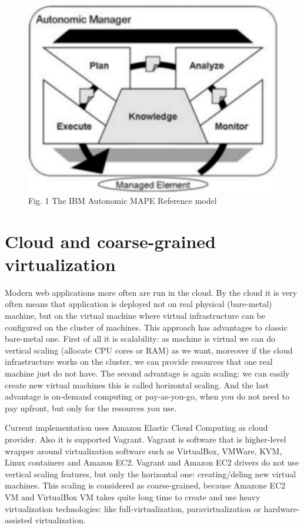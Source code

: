 \begin{figure}[h]
  \centering
    \includegraphics[natwidth=264,natheight=198]{./pictures/mape}
    \caption{Fig. 1 The IBM Autonomic MAPE Reference model}
\end{figure}
  

\section{Cloud and coarse-grained virtualization}
Modern web applications more often are run in the cloud. By the cloud it is very often means that application is deployed not on real physical (bare-metal) machine, but on the virtual machine where virtual infrastructure can be configured on the cluster of machines. This approach has advantages to classic bare-metal one. First of all it is scalability: as machine is virtual we can do vertical scaling (allocate CPU cores or RAM) as we want, moreover if the cloud infrastructure works on the cluster, we can provide resources that one real machine just do not have. The second advantage is again scaling: we can easily create new virtual machines this is called horizontal scaling. And the last advantage is on-demand computing or pay-as-you-go, when you do not need to pay upfront, but only for the resources you use.

\begin{sloppypar}
Current implementation uses Amazon Elastic Cloud Computing as cloud provider. Also it is supported Vagrant. Vagrant is software that is higher-level wrapper around virtualization software such as VirtualBox, VMWare, KVM, Linux containers and Amazon EC2. Vagrant and Amazon EC2 drivers do not use vertical scaling features, but only the horizontal one: creating/deling new virtual machines. This scaling is considered as coarse-grained, because Amazone EC2 VM and VirtualBox VM takes quite long time to create and use heavy virtualization technologies: like full-virtualization, paravirtualization or hardware-assisted virtualization.
\end{sloppypar}


